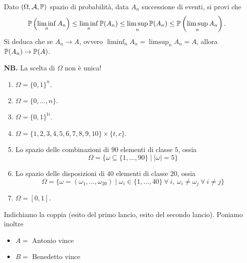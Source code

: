 \Esercizio{$\star$}

Dato $( \Omega ,\mathcal{A} ,\mathbb{P})$ spazio di probabilità, data $A_{n}$ successione di eventi, si provi che
\begin{equation*}
	\mathbb{P}\left(\liminf _{n} A_{n}\right) \leq \liminf _{n}\mathbb{P}( A_{n}) \leq \limsup _{n}\mathbb{P}( A_{n})\leq \mathbb{P}\left(\limsup _{n} A_{n}\right) .
\end{equation*}
Si deduca che se $A_{n}\rightarrow A$, ovvero $\liminf_{n} A_{n} =\limsup _{n} A_{n} =A$, allora $\mathbb{P}( A_{n})\rightarrow \mathbb{P}( A)$.

\ParteSoluzioni

\Soluzione

\textbf{NB.} La scelta di $\Omega $ non è unica!
\begin{enumerate}
	\item $\Omega =\{0,1\}^{n} .$
	\item $\Omega =\{0,\dots ,n\}$.
	\item $\Omega =\{0,1\}^{\mathbb{N}}$.
	\item $\Omega =\{1,2,3,4,5,6,7,8,9,10\} \times \{t,c\}$.
	\item Lo spazio delle combinazioni di $90$ elementi di classe $5$, ossia
	\begin{equation*}
		\Omega =\{\omega \subseteq \{1,\dots ,90\} \mid |\omega |=5\}
	\end{equation*}
	\item Lo spazio delle disposizioni di $40$ elementi di classe $20$, ossia
	\begin{equation*}
		\Omega =\{\omega =( \omega _{1} ,\dots ,\omega _{20}) \mid \omega _{i} \in \{1,\dots ,40\} \ \forall \ i,\ \omega _{i} \neq \omega _{j} \ \forall \ i\neq j\}
	\end{equation*}
	\item $\Omega =[ 0,1]$.
\end{enumerate}

\Soluzione

Indichiamo la coppia (esito del primo lancio, esito del secondo lancio). Poniamo inoltre
\begin{itemize}
	\item $A=$ Antonio vince
	\item $B=$ Benedetto vince
\end{itemize}

